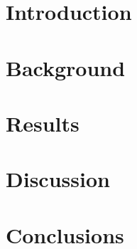 \section{Introduction}

\section{Background}

\section{Results}

\section{Discussion}

\section{Conclusions}
